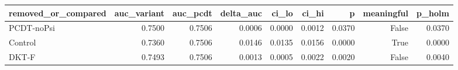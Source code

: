 \begin{tabular}{lrrrrrrrr}
\toprule
removed\_or\_compared & auc\_variant & auc\_pcdt & delta\_auc & ci\_lo & ci\_hi & p & meaningful & p\_holm \\
\midrule
PCDT-noPsi & 0.7500 & 0.7506 & 0.0006 & 0.0000 & 0.0012 & 0.0370 & False & 0.0370 \\
Control & 0.7360 & 0.7506 & 0.0146 & 0.0135 & 0.0156 & 0.0000 & True & 0.0000 \\
DKT-F & 0.7493 & 0.7506 & 0.0013 & 0.0005 & 0.0022 & 0.0020 & False & 0.0040 \\
\bottomrule
\end{tabular}
